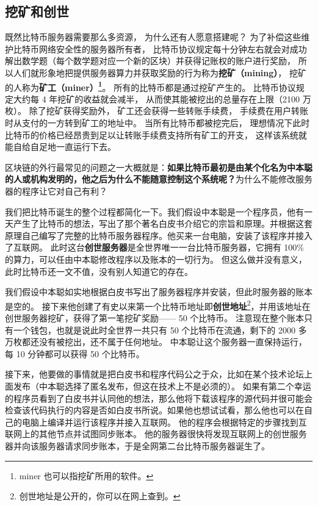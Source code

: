 \subsection{挖矿和创世}
既然比特币服务器需要那么多资源， 为什么还有人愿意搭建呢？ 为了补偿这些维护比特币网络安全性的服务器所有者， 比特币协议规定每十分钟左右就会对成功解出数学题（每个数学题对应一个新的区块）并获得记账权的账户进行奖励， 所以人们就形象地把提供服务器算力并获取奖励的行为称为\textbf{挖矿（mining）}， 挖矿的人称为\textbf{矿工（miner）\footnote{miner 也可以指挖矿所用的软件。}}。 所有的比特币都是通过挖矿产生的。 比特币协议规定大约每 4 年挖矿的收益就会减半， 从而使其能被挖出的总量存在上限（2100 万枚）。 除了挖矿获得奖励外， 矿工还会获得一些转账手续费， 手续费在用户转账时从支付的一方转到矿工的地址中。 当所有比特币都被挖完后， 理想情况下此时比特币的价格已经昂贵到足以让转账手续费支持所有矿工的开支， 这样该系统就能自给自足地一直运行下去。

区块链的外行最常见的问题之一大概就是：\textbf{如果比特币最初是由某个化名为中本聪的人或机构发明的，他之后为什么不能随意控制这个系统呢？}为什么不能修改服务器的程序让它对自己有利？

我们把比特币诞生的整个过程都简化一下。我们假设中本聪是一个程序员，他有一天产生了比特币的想法，写出了那个著名白皮书介绍它的宗旨和原理。并根据这套原理自己编写了完整的比特币服务器程序。他买来一台电脑，安装了该程序并接入了互联网。 此时这台\textbf{创世服务器}是全世界唯一一台比特币服务器，它拥有 100\% 的算力，可以任由中本聪修改程序以及账本的一切行为。 但这么做并没有意义，此时比特币还一文不值，没有别人知道它的存在。

我们假设中本聪如实地根据白皮书写出了服务器程序并安装，但此时服务器的账本是空的。 接下来他创建了有史以来第一个比特币地址即\textbf{创世地址}\footnote{创世地址是公开的，你可以在网上查到。}，并用该地址在创世服务器挖矿，获得了第一笔挖矿奖励—— 50 个比特币。 注意现在整个账本只有一个钱包，也就是说此时全世界一共只有 50 个比特币在流通，剩下的 2000 多万枚都还没有被挖出，还不属于任何地址。 中本聪让这个服务器一直保持运行，每 10 分钟都可以获得 50 个比特币。

接下来，他要做的事情就是把白皮书和程序代码公之于众，比如在某个技术论坛上面发布（中本聪选择了匿名发布，但这在技术上不是必须的）。 如果有第二个幸运的程序员看到了白皮书并认同他的想法，那么他将下载该程序的源代码并很可能会检查该代码执行的内容是否如白皮书所说。如果他也想试试看，那么他也可以在自己的电脑上编译并运行该程序并接入互联网。 他的程序会根据特定的步骤找到互联网上的其他节点并试图同步账本。 他的服务器很快将发现互联网上的创世服务器并向该服务器请求同步账本，于是全网第二台比特币服务器诞生了。

